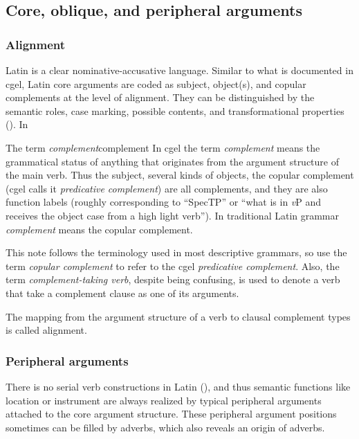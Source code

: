 \documentclass[UTF8, a4paper, oneside]{report}
\newcommand*{\term}[1]{\emph{#1}}
\newcommand{\vP}{\textit{v}P}
\begin{document}
\subsection{Core, oblique, and peripheral arguments}

\subsubsection{Alignment}

Latin is a clear nominative-accusative language.
Similar to what is documented in \acs{cgel},
Latin core arguments are coded as subject, object(s),
and copular complements at the level of alignment.
They can be distinguished by the semantic roles,
case marking, possible contents, and transformational properties 
().
In 

\begin{theorybox}{The term \term{complement}}{complement}
    In \ac{cgel} the term \term{complement} 
    means the grammatical status of anything that originates from the argument structure of the main verb.
    Thus the subject, several kinds of objects,
    the copular complement (\ac{cgel} calls it \term{predicative complement}) are all complements,
    and they are also function labels 
    (roughly corresponding to ``SpecTP'' or ``what is in \vP{} 
    and receives the object case from a high light verb'').
    In traditional Latin grammar \term{complement} means the copular complement. 

    This note follows the terminology used in most descriptive grammars,
    so use the term \term{copular complement} to refer to the \ac{cgel} \term{predicative complement}.
    Also, the term \term{complement-taking verb}, despite being confusing,
    is used to denote a verb that take a complement clause as one of its arguments.

    The mapping from the argument structure of a verb 
    to clausal complement types is called alignment.
\end{theorybox}

\subsubsection{Peripheral arguments}

There is no serial verb constructions in Latin (),
and thus semantic functions like location or instrument 
are always realized by typical peripheral arguments
attached to the core argument structure.
These peripheral argument positions sometimes can be filled by adverbs,
which also reveals an origin of adverbs.
\end{document}
